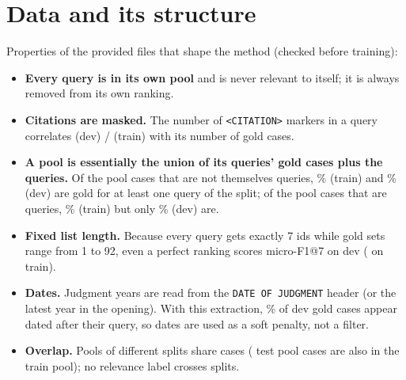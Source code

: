 \documentclass[11pt,a4paper]{article}
\newcommand{\code}[1]{\texttt{\small #1}}
\begin{document}
\section{Data and its structure}\label{sec:data}
\begin{table}[H]\centering\small
\caption{Splits.  Self = queries that also occur in their own pool; Gold = relevant cases per query (mean,
median, range); Cit.\ = median number of \code{<CITATION>} markers per query; lengths in words (median).}\label{tab:data}
\end{table}

Properties of the provided files that shape the method (checked before training):
\begin{itemize}
  \item \textbf{Every query is in its own pool} and is never relevant to itself; it is always removed from
  its own ranking.
  \item \textbf{Citations are masked.}  The number of \code{<CITATION>} markers in a query correlates
  \corrcitdev{} (dev) / \corrcittrain{} (train) with its number of gold cases.
  \item \textbf{A pool is essentially the union of its queries' gold cases plus the queries.}  Of the pool cases
  that are not themselves queries, \nonqgoldtrain\% (train) and \nonqgolddev\% (dev) are gold for at least one
  query of the split; of the pool cases that are queries, \qgoldtrain\% (train) but only \qgolddev\% (dev) are.
  \item \textbf{Fixed list length.}  Because every query gets exactly 7 ids while gold sets range from 1 to 92,
  even a perfect ranking scores micro-F1@7 \oracledev{} on dev (\oracletrain{} on train).
  \item \textbf{Dates.}  Judgment years are read from the \code{DATE OF JUDGMENT} header (or the latest year in
  the opening).  With this extraction, \relnewer\% of dev gold cases appear dated after their query, so dates are
  used as a soft penalty, not a filter.
  \item \textbf{Overlap.}  Pools of different splits share cases (\testpooltrain{} test pool cases are also in
  the train pool); no relevance label crosses splits.
\end{itemize}
\end{document}
